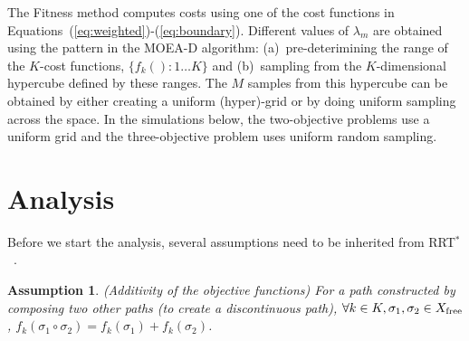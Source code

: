 \documentclass{article}
\newtheorem{asmp}{Assumption}
\begin{document}
The {\sc Fitness} method computes costs using one of the cost functions in Equations~(\ref{eq:weighted})-(\ref{eq:boundary}).  Different values of $\lambda_m$ are obtained using the pattern in the MOEA-D algorithm: (a)~pre-deterimining the range of the $K$-cost functions, $\{f_k():1\ldots K\}$ and (b)~sampling from the $K$-dimensional hypercube defined by these ranges. The $M$ samples from this hypercube can be obtained by either creating a uniform (hyper)-grid or by doing uniform sampling across the space.  In the simulations below, the two-objective problems use a uniform grid and the three-objective problem uses uniform random sampling. 


\section{Analysis}
\label{sec:theoretic_analysis}

Before we start the analysis, several assumptions need to be inherited from  RRT$^{*}$~\cite{Karaman.Frazzoli:RSS10}.
\begin{asmp}{(Additivity of the objective functions)}
\label{asmp:additivity}	
For a path constructed by composing two other paths (to create a discontinuous path), $\forall k\in K, \sigma_1,\sigma_2\in X_{\rm free}$, $f_k(\sigma_1\circ\sigma_2) = f_k(\sigma_1) + f_k(\sigma_2)$.
\end{asmp}
\end{document}
